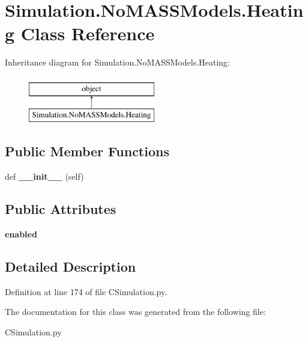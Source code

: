\hypertarget{class_c_simulation_1_1_simulation_1_1_no_m_a_s_s_models_1_1_heating}{}\section{Simulation.\+No\+M\+A\+S\+S\+Models.\+Heating Class Reference}
\label{class_c_simulation_1_1_simulation_1_1_no_m_a_s_s_models_1_1_heating}
Inheritance diagram for Simulation.\+No\+M\+A\+S\+S\+Models.\+Heating\+:\begin{figure}[H]
\begin{center}
\leavevmode
\includegraphics[height=2.000000cm]{class_c_simulation_1_1_simulation_1_1_no_m_a_s_s_models_1_1_heating}
\end{center}
\end{figure}
\subsection*{Public Member Functions}
\begin{DoxyCompactItemize}
\item 
\mbox{\label{class_c_simulation_1_1_simulation_1_1_no_m_a_s_s_models_1_1_heating_ae64f0875afe3067b97ba370b354b9213}} 
def {\bfseries \+\_\+\+\_\+init\+\_\+\+\_\+} (self)
\end{DoxyCompactItemize}
\subsection*{Public Attributes}
\begin{DoxyCompactItemize}
\item 
\mbox{\label{class_c_simulation_1_1_simulation_1_1_no_m_a_s_s_models_1_1_heating_a91b39549c797bd5646357c8b6eecad0f}} 
{\bfseries enabled}
\end{DoxyCompactItemize}


\subsection{Detailed Description}


Definition at line 174 of file C\+Simulation.\+py.



The documentation for this class was generated from the following file\+:\begin{DoxyCompactItemize}
\item 
C\+Simulation.\+py\end{DoxyCompactItemize}
